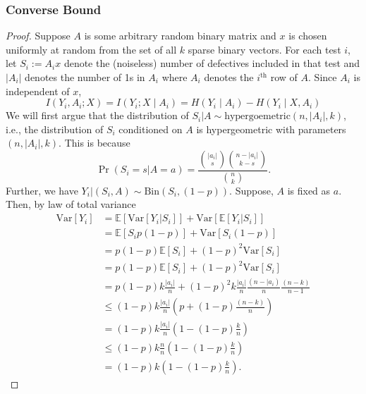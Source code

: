 \documentclass{article}
\begin{document}
\subsubsection{Converse Bound}
\begin{proof}
Suppose $A$ is some arbitrary random binary matrix and $x$ is chosen uniformly at random from the set of all $k$ sparse binary vectors. For each test $i$, let $S_i := A_i x$ denote the (noiseless) number of defectives included in that test and $|A_i|$ denotes the number of 1s in $A_i$ where $A_i$ denotes the $i^{\text{th}}$ row of $A$.  
Since $A_i$ is independent of $x$, 
\[
I(Y_i,A_i;X)=I(Y_i;X\mid A_i)=H(Y_i\mid A_i)-H(Y_i\mid X,A_i)
\]
We will first argue that the distribution of $S_i|A\sim \text{hypergoemetric}(n, |A_i|,k)$, i.e., the distribution of $S_i$ conditioned on $A$ is hypergeometric with parameters $(n,|A_i|,k)$. This is because 
\[
\Pr(S_i = s|A=a) = \frac{\binom{|a_i|}{s}\binom{n-|a_i|}{k-s}}{\binom{n}{k}}.
\]
Further, we have $Y_i|(S_i,A)\sim \mathrm{Bin}(S_i,(1-p))$. 
Suppose, $A$ is fixed as $a$. Then, by law of total variance
\begin{align*}
\text{Var}[Y_i] &= \mathbb{E}[\text{Var}[Y_i|S_i]]+ \text{Var}[\mathbb{E}[Y_i|S_i]]\\
& = \mathbb{E}[S_i p(1-p)] + \text{Var}[S_i(1-p)]\\
& = p(1-p)\mathbb{E}[S_i] + (1-p)^2\text{Var}[S_i]\\
& = p(1-p)\mathbb{E}[S_i] + (1-p)^2\text{Var}[S_i]\\
& =p(1-p)k\frac{|a_i|}{n} + (1-p)^2k\frac{|a_i|}{n}\frac{(n-|a_i)}{n}\frac{(n-k)}{n-1}\\
& \leq (1-p)k\frac{|a_i|}{n}\left(p+(1-p)\frac{(n-k)}{n}\right)\\
& = (1-p)k\frac{|a_i|}{n}\left(1-(1-p)\frac{k}{n}\right)\\
& \leq (1-p)k\frac{n}{n}\left(1-(1-p)\frac{k}{n}\right)\\
& =(1-p)k\left(1-(1-p)\frac{k}{n}\right).
\end{align*}



\end{proof}
\end{document}

